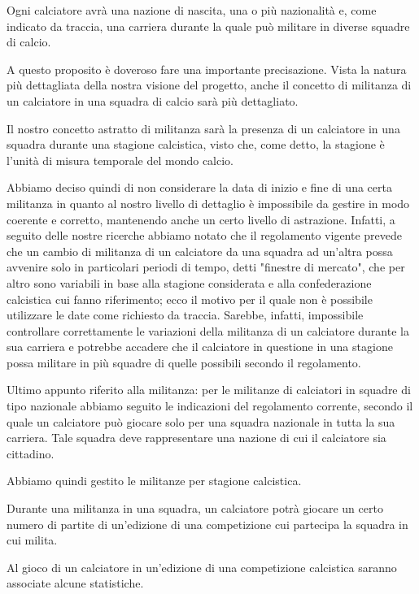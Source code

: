 \bigskip
\bigskip

Ogni calciatore avrà una nazione di nascita, una o più nazionalità e,
come indicato da traccia, una carriera durante la quale può militare in diverse
squadre di calcio.

A questo proposito è doveroso fare una importante precisazione. Vista la natura più dettagliata
della nostra visione del progetto, anche il concetto di militanza di un calciatore in una squadra
di calcio sarà più dettagliato.

Il nostro concetto astratto di militanza sarà la presenza di un calciatore in una squadra
durante una stagione calcistica, visto che, come detto, la stagione è l'unità di misura
temporale del mondo calcio.

Abbiamo deciso quindi di non considerare la data di inizio e fine di una certa militanza in
quanto al nostro livello di dettaglio è impossibile da gestire in modo coerente e corretto,
mantenendo anche un certo livello di astrazione.
Infatti, a seguito delle nostre ricerche abbiamo notato che il regolamento vigente
prevede che un cambio di militanza di un calciatore da una squadra ad un'altra
possa avvenire solo in particolari periodi di tempo, detti "finestre di mercato",
che per altro sono variabili in base alla stagione considerata e alla confederazione
calcistica cui fanno riferimento; ecco il motivo per il quale non è possibile utilizzare
le date come richiesto da traccia.
Sarebbe, infatti, impossibile controllare correttamente le variazioni della militanza di un calciatore
durante la sua carriera e potrebbe accadere che il calciatore in questione in una stagione
possa militare in più squadre di quelle possibili secondo il regolamento.

Ultimo appunto riferito alla militanza: per le militanze di calciatori in squadre di tipo
nazionale abbiamo seguito le indicazioni del regolamento corrente, secondo il quale un calciatore
può giocare solo per una squadra nazionale in tutta la sua carriera. Tale squadra
deve rappresentare una nazione di cui il calciatore sia cittadino.

Abbiamo quindi gestito le militanze per stagione calcistica.

Durante una militanza in una squadra, un calciatore potrà giocare un certo numero di
partite di un'edizione di una competizione cui partecipa la squadra in cui milita.

Al gioco di un calciatore in un'edizione di una competizione calcistica saranno associate
alcune statistiche.

